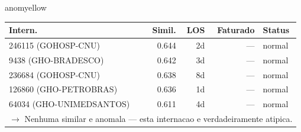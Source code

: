 \documentclass[a4paper,10pt]{article}
\begin{document}
\begin{anomalycard}[Internacao 6181 | GHO-PETROBRAS | MODERADO (z=2.65)]{anomyellow}
\begin{tabular}{l r r r l}\toprule\textbf{Intern.} & \textbf{Simil.} & \textbf{LOS} & \textbf{Faturado} & \textbf{Status} \\\midrule
246115 (GOHOSP-CNU) & 0.644 & 2d & --- & \textcolor{jcubeblue}{normal} \\
9438 (GHO-BRADESCO) & 0.642 & 3d & --- & \textcolor{jcubeblue}{normal} \\
236684 (GOHOSP-CNU) & 0.638 & 8d & --- & \textcolor{jcubeblue}{normal} \\
126860 (GHO-PETROBRAS) & 0.636 & 1d & --- & \textcolor{jcubeblue}{normal} \\
64034 (GHO-UNIMEDSANTOS) & 0.611 & 4d & --- & \textcolor{jcubeblue}{normal} \\
\multicolumn{5}{l}{\textcolor{jcubeblue}{\small $\rightarrow$ Nenhuma similar e anomala --- esta internacao e verdadeiramente atipica.}} \\
\bottomrule\end{tabular}


\end{anomalycard}

\newpage
\end{document}
